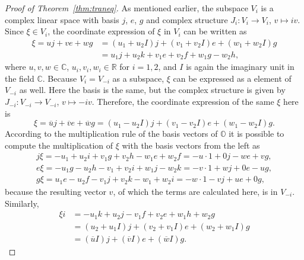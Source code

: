 \documentclass[10pt,a4paper]{amsart}
\numberwithin{equation}{section}
\newcommand{\SR}{\mathbb{R}} %
\newcommand{\SC}{\mathbb{C}} %
\newcommand{\SO}{\mathbb{O}} %
\begin{document}
\begin{proof}[Proof of Theorem~\ref{thm:traneq}]
 As mentioned earlier, the subspace $V_i$ is a complex linear space with basis $j$, $e$, $g$ and complex structure $J_i\colon V_i \rightarrow V_i$, $v \mapsto iv$. Since $\xi \in V_i$, the coordinate expression of $\xi$ in $V_i$ can be written as
 \begin{align*} \xi = uj+ve+wg&=(u_1+u_2 I)j+(v_1+v_2 I)e+(w_1+w_2 I)g\\
 & = u_1j+u_2k+v_1e+v_2f+w_1g-w_2h,
 \end{align*}
 where $u,v,w \in \SC$, $u_i,v_i,w_i \in \SR$ for $i=1,2$, and $I$ is again the imaginary unit in the field $\SC$.
 Because $V_i=V_{-i}$ as a subspace, $\xi$ can be expressed as a element of $V_{-i}$ as well. Here the basis is the same, but the complex structure is given by $J_{-i}\colon V_{-i} \rightarrow V_{-i}$, $v \mapsto -iv$. Therefore, the coordinate expression of the same $\xi$ here is
 \[ \xi =\overline{u}j+\overline{v}e+\overline{w}g=(u_1-u_2 I)j+(v_1-v_2 I)e+(w_1-w_2 I)g .\]
 According to the multiplication rule of the basis vectors of $\SO$ it is possible to compute the multiplication of $\xi$ with the basis vectors from the left as
 \begin{gather*}
 j\xi = -u_1+u_2i+v_1g+v_2h-w_1e+w_2f=-u\cdot 1+0j-we+vg,\\
 e\xi =-u_1g-u_2h-v_1+v_2i+w_1j-w_2k=-v\cdot 1+wj+0e-ug,\\
 g\xi =u_1e-u_2f-v_1j+v_2k-w_1+w_2i=-w\cdot 1-vj+ue+0g,
 \end{gather*}
 because the resulting vector $v$, of which the terms are calculated here, is in $V_{-i}$. Similarly,
 \begin{align*}
 \xi i &= -u_1k+u_2j-v_1f+v_2e+w_1h+w_2g\\
 &=(u_2+ u_1 I)j+(v_2+v_1 I)e+(w_2+w_1 I)g\\
 &=(\overline{u} I)j+(\overline{v} I)e+(\overline{w}I)g .
 \end{align*}


\end{proof}
\end{document}
